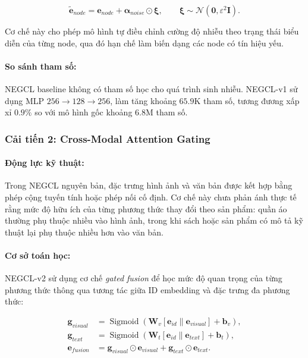 \begin{equation}
\widetilde{\mathbf{e}}_{node}
= \mathbf{e}_{node}+\boldsymbol{\alpha}_{noise}\odot\boldsymbol{\xi},
\qquad
\boldsymbol{\xi}\sim\mathcal{N}(\mathbf{0},\varepsilon^2\mathbf{I}).
\end{equation}

Cơ chế này cho phép mô hình tự điều chỉnh cường độ nhiễu theo trạng thái biểu diễn của từng node, qua đó hạn chế làm biến dạng các node có tín hiệu yếu.

\paragraph{So sánh tham số:}
NEGCL baseline không có tham số học cho quá trình sinh nhiễu. NEGCL-v1 sử dụng MLP $256\rightarrow128\rightarrow256$, làm tăng khoảng $65.9$K tham số, tương đương xấp xỉ $0.9\%$ so với mô hình gốc khoảng $6.8$M tham số.

\subsubsection{Cải tiến 2: Cross-Modal Attention Gating}

\paragraph{Động lực kỹ thuật:}
Trong NEGCL nguyên bản, đặc trưng hình ảnh và văn bản được kết hợp bằng phép cộng tuyến tính hoặc phép nối cố định. Cơ chế này chưa phản ánh thực tế rằng mức độ hữu ích của từng phương thức thay đổi theo sản phẩm: quần áo thường phụ thuộc nhiều vào hình ảnh, trong khi sách hoặc sản phẩm có mô tả kỹ thuật lại phụ thuộc nhiều hơn vào văn bản.

\paragraph{Cơ sở toán học:}
NEGCL-v2 sử dụng cơ chế \textit{gated fusion} để học mức độ quan trọng của từng phương thức thông qua tương tác giữa ID embedding và đặc trưng đa phương thức:

\begin{align}
\mathbf{g}_{visual}
&= \operatorname{Sigmoid}\!\left(\mathbf{W}_v[\mathbf{e}_{id}\parallel\mathbf{e}_{visual}]+\mathbf{b}_v\right),\\
\mathbf{g}_{text}
&= \operatorname{Sigmoid}\!\left(\mathbf{W}_t[\mathbf{e}_{id}\parallel\mathbf{e}_{text}]+\mathbf{b}_t\right),\\
\mathbf{e}_{fusion}
&= \mathbf{g}_{visual}\odot\mathbf{e}_{visual}
+\mathbf{g}_{text}\odot\mathbf{e}_{text}.
\end{align}

